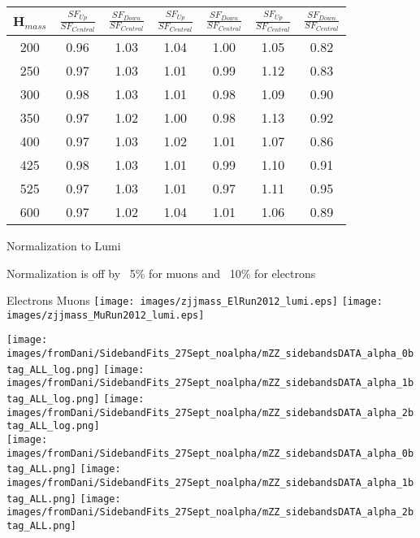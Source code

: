 \documentclass{beamer}
\begin{document}
\begin{frame}
\begin{center}
{\begin{tabular}{c|c|c|c|c|c|c}
H$_{mass}$ & $\frac{SF_{Up}}{SF_{Central}}$  &
$\frac{SF_{Down}}{SF_{Central}}$ & $\frac{SF_{Up}}{SF_{Central}}$   &
$\frac{SF_{Down}}{SF_{Central}}$ & $\frac{SF_{Up}}{SF_{Central}}$   & $\frac{SF_{Down}}{SF_{Central}}$  \\
\hline
200    &  0.96 & 1.03 & 1.04 & 1.00 &1.05&0.82\\
250    &  0.97 & 1.03 & 1.01 & 0.99 &1.12&0.83\\
300    &  0.98 & 1.03 & 1.01 & 0.98 &1.09&0.90\\
350    &  0.97 & 1.02 & 1.00 & 0.98 &1.13&0.92\\
400    &  0.97 & 1.03 & 1.02 & 1.01 &1.07&0.86\\
425    &  0.98 & 1.03 & 1.01 & 0.99 &1.10&0.91\\
525    &  0.97 & 1.03 & 1.01 & 0.97 &1.11&0.95\\
600    &  0.97 & 1.02 & 1.04 & 1.01 &1.06&0.89\\
\hline
\hline
\end{tabular}

}
\end{center}
\end{frame}


\begin{frame}{Normalization to Lumi}
\begin{center}
Normalization is off by ~5\% for muons and ~10\% for electrons
\\

\vspace{2em}

Electrons \hspace{12em} Muons \vspace{3em}
\texttt{[image: images/zjjmass\_ElRun2012\_lumi.eps]}
\texttt{[image: images/zjjmass\_MuRun2012\_lumi.eps]}
\end{center}
\end{frame}



\begin{frame}
\texttt{[image: images/fromDani/SidebandFits\_27Sept\_noalpha/mZZ\_sidebandsDATA\_alpha\_0btag\_ALL\_log.png]}
\texttt{[image: images/fromDani/SidebandFits\_27Sept\_noalpha/mZZ\_sidebandsDATA\_alpha\_1btag\_ALL\_log.png]}
\texttt{[image: images/fromDani/SidebandFits\_27Sept\_noalpha/mZZ\_sidebandsDATA\_alpha\_2btag\_ALL\_log.png]}\\
\texttt{[image: images/fromDani/SidebandFits\_27Sept\_noalpha/mZZ\_sidebandsDATA\_alpha\_0btag\_ALL.png]}
\texttt{[image: images/fromDani/SidebandFits\_27Sept\_noalpha/mZZ\_sidebandsDATA\_alpha\_1btag\_ALL.png]}
\texttt{[image: images/fromDani/SidebandFits\_27Sept\_noalpha/mZZ\_sidebandsDATA\_alpha\_2btag\_ALL.png]}

\end{frame}
\end{document}
